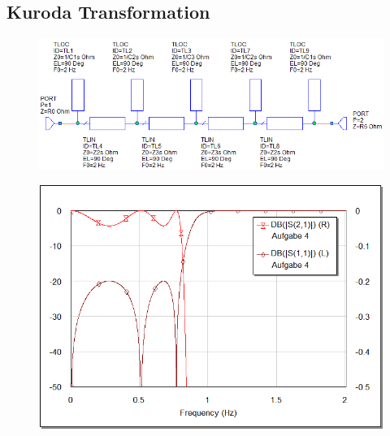 \subsection{Kuroda Transformation}

\begin{figure}[h!]
    \centering
    \includegraphics[width=\imagewidth]{images/stripline-kuroda}
    \caption{}
\end{figure}

\begin{figure}[h!]
    \centering
    \includegraphics[width=\imagewidth]{images/graph-kuroda}
    \caption{}
\end{figure}

